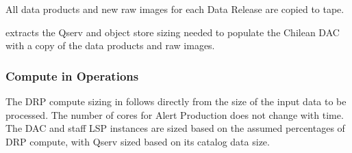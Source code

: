All data products and new raw images for each Data Release are copied to tape.

 extracts the Qserv and object store sizing needed to populate the Chilean DAC with a copy of the data products and raw images.

\subsubsection{Compute in Operations}

The DRP compute sizing in  follows directly from the size of the input data to be processed.
The number of cores for Alert Production does not change with time.
The DAC and staff LSP instances are sized based on the assumed percentages of DRP compute, with Qserv sized based on its catalog data size.
